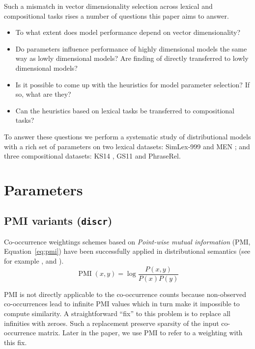 \documentclass[11pt,letterpaper]{article}
\begin{document}
Such a mismatch in vector dimensionality selection across lexical and compositional tasks rises a number of questions this paper aims to answer.
\begin{itemize}
\item To what extent does model performance depend on vector dimensionality?
\item Do parameters influence performance of highly dimensional models the same way as lowly dimensional models? Are finding of  directly transferred to lowly dimensional models?
\item Is it possible to come up with the heuristics for model parameter selection? If so, what are they?
\item Can the heuristics based on lexical tasks be transferred to compositional tasks?
\end{itemize}

To answer these questions we perform a systematic study of distributional models with a rich set of parameters on two lexical datasets: SimLex-999 \cite{hill2014simlex} and MEN \cite{Bruni:2014:MDS:2655713.2655714}; and three compositional datasets: KS14 \cite{kartsadrqpl2014}, GS11 \cite{Grefenstette:2011:ESC:2145432.2145580} and PhraseRel.

\section{Parameters}
\label{sec:parameters}

\subsection{PMI variants (\texttt{discr})}
\label{sec:pmi-variants}

Co-occurrence weightings schemes based on \emph{Point-wise mutual information} (PMI, Equation~\ref{eq:pmi}) have been successfully applied in distributional semantics (see for example ,  and ).
%
\begin{equation}
  \label{eq:pmi}
  \operatorname{PMI}(x, y) = \log\frac{P(x,y)}{P(x)P(y)}
\end{equation}

PMI is not directly applicable to the co-occurrence counts because non-observed co-occurrences lead to infinite PMI values which in turn make it impossible to compute similarity. A straightforward ``fix'' to this problem is to replace all infinities with zeroes. Such a replacement preserve sparsity of the input co-occurrence matrix. Later in the paper, we use PMI to refer to a weighting with this fix.
\end{document}
